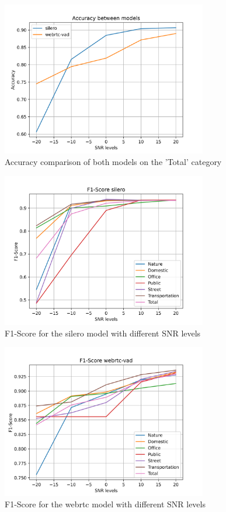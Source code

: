\documentclass[../main.tex]{subfiles}
\begin{document}
\begin{figure}[ht]
    \centering
    \includegraphics[width=0.8\textwidth]{images/Accuracy between models.png}
    \caption{Accuracy comparison of both models on the 'Total' category}
    \label{fig:accuracy both models}
\end{figure}

\begin{figure}[ht]
    \centering
    \includegraphics[width=0.8\textwidth]{images/F1-Score silero.png}
    \caption{F1-Score for the silero model with different SNR levels}
    \label{fig:f1-score silero}
\end{figure}

\begin{figure}[ht]
    \centering
    \includegraphics[width=0.8\textwidth]{images/F1-Score webrtc-vad.png}
    \caption{F1-Score for the webrtc model with different SNR levels}
    \label{fig:f1-score webrtc}
\end{figure}
\end{document}
